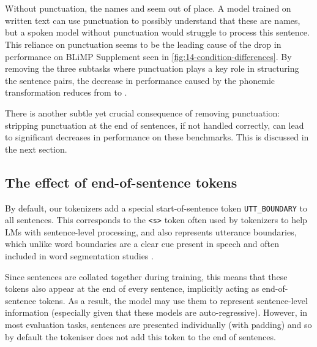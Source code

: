 \vspace{-1mm}
\begin{center}
~\textvisiblespace~~\textvisiblespace~~\textvisiblespace~~\textvisiblespace~~~~\textvisiblespace~~\textvisiblespace~~\textvisiblespace\\~~\textvisiblespace~~\textvisiblespace~~\textvisiblespace
\end{center}
\vspace{-1mm}

Without punctuation, the names  and  seem out of place. A model trained on written text can use punctuation to possibly understand that these are names, but a spoken model without punctuation would struggle to process this sentence. This reliance on punctuation seems to be the leading cause of the drop in performance on BLiMP Supplement seen in \cref{fig:14-condition-differences}. By removing the three subtasks where punctuation plays a key role in structuring the sentence pairs, the decrease in performance caused by the phonemic transformation reduces from  to .

There is another subtle yet crucial consequence of removing punctuation: stripping punctuation at the end of sentences, if not handled correctly, can lead to significant decreases in performance on these benchmarks. This is discussed in the next section.

\subsection{The effect of end-of-sentence tokens}\label{sec:14-endofsentence}

By default, our tokenizers add a special start-of-sentence token \texttt{UTT\_BOUNDARY} to all sentences. This corresponds to the \texttt{<s>} token often used by tokenizers to help LMs with sentence-level processing, and also represents utterance boundaries, which unlike word boundaries are a clear cue present in speech and often included in word segmentation studies \citep{feliciano-de-faria-2019-utterance-boundaries}. 

Since sentences are collated together during training, this means that these tokens also appear at the end of every sentence, implicitly acting as end-of-sentence tokens. As a result, the model may use them to represent sentence-level information (especially given that these models are auto-regressive). However, in most evaluation tasks, sentences are presented individually (with padding) and so by default the tokeniser does not add this token to the end of sentences. 


